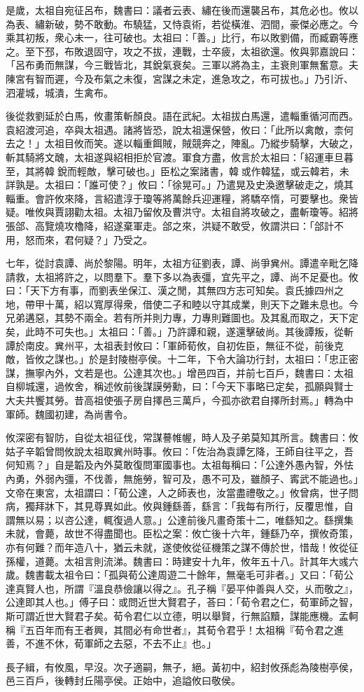 \begin{pinyinscope}
是歲，太祖自宛征呂布，魏書曰：議者云表、繡在後而還襲呂布，其危必也。攸以為表、繡新破，勢不敢動。布驍猛，又恃袁術，若從橫淮、泗間，豪傑必應之。今乘其初叛，衆心未一，往可破也。太祖曰：「善。」比行，布以敗劉備，而臧霸等應之。至下邳，布敗退固守，攻之不拔，連戰，士卒疲，太祖欲還。攸與郭嘉說曰：「呂布勇而無謀，今三戰皆北，其銳氣衰矣。三軍以將為主，主衰則軍無奮意。夫陳宮有智而遲，今及布氣之未復，宮謀之未定，進急攻之，布可拔也。」乃引沂、泗灌城，城潰，生禽布。

後從救劉延於白馬，攸畫策斬顏良。語在武紀。太祖拔白馬還，遣輜重循河而西。袁紹渡河追，卒與太祖遇。諸將皆恐，說太祖還保營，攸曰：「此所以禽敵，柰何去之！」太祖目攸而笑。遂以輜重餌賊，賊競奔之，陣亂。乃縱步騎擊，大破之，斬其騎將文醜，太祖遂與紹相拒於官渡。軍食方盡，攸言於太祖曰：「紹運車旦暮至，其將韓𦳣銳而輕敵，擊可破也。」臣松之案諸書，韓𦳣或作韓猛，或云韓若，未詳孰是。太祖曰：「誰可使？」攸曰：「徐晃可。」乃遣晃及史渙邀擊破走之，燒其輜重。會許攸來降，言紹遣淳于瓊等將萬餘兵迎運糧，將驕卒惰，可要擊也。衆皆疑。唯攸與賈詡勸太祖。太祖乃留攸及曹洪守。太祖自將攻破之，盡斬瓊等。紹將張郃、高覽燒攻櫓降，紹遂棄軍走。郃之來，洪疑不敢受，攸謂洪曰：「郃計不用，怒而來，君何疑？」乃受之。

七年，從討袁譚、尚於黎陽。明年，太祖方征劉表，譚、尚爭兾州。譚遣辛毗乞降請救，太祖將許之，以問羣下。羣下多以為表彊，宜先平之，譚、尚不足憂也。攸曰：「天下方有事，而劉表坐保江、漢之閒，其無四方志可知矣。袁氏據四州之地，帶甲十萬，紹以寬厚得衆，借使二子和睦以守其成業，則天下之難未息也。今兄弟遘惡，其勢不兩全。若有所并則力專，力專則難圖也。及其亂而取之，天下定矣，此時不可失也。」太祖曰：「善。」乃許譚和親，遂還擊破尚。其後譚叛，從斬譚於南皮。兾州平，太祖表封攸曰：「軍師荀攸，自初佐臣，無征不從，前後克敵，皆攸之謀也。」於是封陵樹亭侯。十二年，下令大論功行封，太祖曰：「忠正密謀，撫寧內外，文若是也。公達其次也。」增邑四百，并前七百戶，魏書曰：太祖自柳城還，過攸舍，稱述攸前後謀謨勞勳，曰：「今天下事略已定矣，孤願與賢士大夫共饗其勞。昔高祖使張子房自擇邑三萬戶，今孤亦欲君自擇所封焉。」轉為中軍師。魏國初建，為尚書令。

攸深密有智防，自從太祖征伐，常謀謩帷幄，時人及子弟莫知其所言。魏書曰：攸姑子辛韜曾問攸說太祖取兾州時事。攸曰：「佐治為袁譚乞降，王師自往平之，吾何知焉？」自是韜及內外莫敢復問軍國事也。太祖每稱曰：「公達外愚內智，外怯內勇，外弱內彊，不伐善，無施勞，智可及，愚不可及，雖顏子、寗武不能過也。」文帝在東宮，太祖謂曰：「荀公達，人之師表也，汝當盡禮敬之。」攸曾病，世子問病，獨拜牀下，其見尊異如此。攸與鍾繇善，繇言：「我每有所行，反覆思惟，自謂無以易；以咨公達，輒復過人意。」公達前後凡畫奇策十二，唯繇知之。繇撰集未就，會薨，故世不得盡聞也。臣松之案：攸亡後十六年，鍾繇乃卒，撰攸奇策，亦有何難？而年造八十，猶云未就，遂使攸從征機策之謀不傳於世，惜哉！攸從征孫權，道薨。太祖言則流涕。魏書曰：時建安十九年，攸年五十八。計其年大彧六歲。魏書載太祖令曰：「孤與荀公達周遊二十餘年，無毫毛可非者。」又曰：「荀公達真賢人也，所謂『溫良恭儉讓以得之』。孔子稱『晏平仲善與人交，乆而敬之』，公達即其人也。」傅子曰：或問近世大賢君子，荅曰：「荀令君之仁，荀軍師之智，斯可謂近世大賢君子矣。荀令君仁以立德，明以舉賢，行無諂黷，謀能應機。孟軻稱『五百年而有王者興，其間必有命世者』，其荀令君乎！太祖稱『荀令君之進善，不進不休，荀軍師之去惡，不去不止』也。」

長子緝，有攸風，早沒。次子適嗣，無子，絕。黃初中，紹封攸孫彪為陵樹亭侯，邑三百戶，後轉封丘陽亭侯。正始中，追謚攸曰敬侯。


\end{pinyinscope}